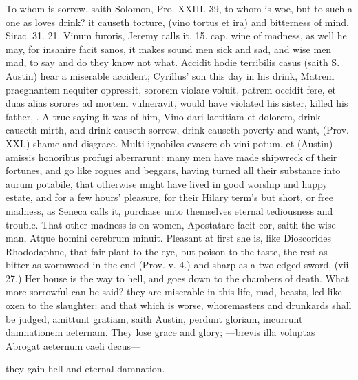 {To whom is sorrow, saith Solomon, Pro. XXIII. 39, to whom is woe, but
to such a one as loves drink? it causeth torture, (vino tortus et ira)
and bitterness of mind, Sirac. 31. 21. Vinum furoris, Jeremy calls it,
15. cap. wine of madness, as well he may, for insanire facit sanos, it
makes sound men sick and sad, and wise men mad, to say and do
they know not what. Accidit hodie terribilis casus (saith S.
Austin) hear a miserable accident; Cyrillus' son this day in his drink,
Matrem praegnantem nequiter oppressit, sororem violare voluit, patrem
occidit fere, et duas alias sorores ad mortem vulneravit, would have
violated his sister, killed his father, \etc{}. A true saying it was of
him, Vino dari laetitiam et dolorem, drink causeth mirth, and drink
causeth sorrow, drink causeth poverty and want, (Prov. XXI.) shame and
disgrace. Multi ignobiles evasere ob vini potum, et (Austin) amissis
honoribus profugi aberrarunt: many men have made shipwreck of their
fortunes, and go like rogues and beggars, having turned all their
substance into aurum potabile, that otherwise might have lived in good
worship and happy estate, and for a few hours' pleasure, for their
Hilary term's but short, or free madness, as Seneca calls it,
purchase unto themselves eternal tediousness and trouble.
That other madness is on women, Apostatare facit cor, saith the wise
man, Atque homini cerebrum minuit. Pleasant at first she is, like
Dioscorides Rhododaphne, that fair plant to the eye, but poison to the
taste, the rest as bitter as wormwood in the end (Prov. v. 4.) and
sharp as a two-edged sword, (vii. 27.) Her house is the way to hell,
and goes down to the chambers of death. What more sorrowful can be
said? they are miserable in this life, mad, beasts, led like oxen
to the slaughter: and that which is worse, whoremasters and drunkards
shall be judged, amittunt gratiam, saith Austin, perdunt gloriam,
incurrunt damnationem aeternam. They lose grace and glory;
---brevis illa voluptas
Abrogat aeternum caeli decus---

they gain hell and eternal damnation.

}
